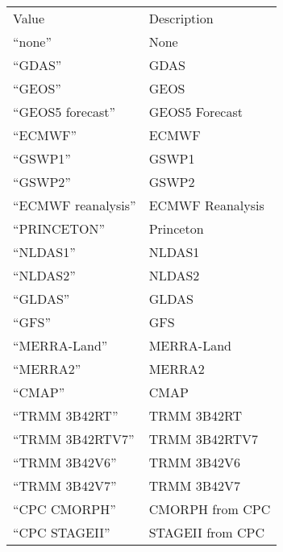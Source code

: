  \begin{tabular}{ll}
 Value                         & Description                        \\
 ``none''                      & None                               \\
 ``GDAS''                      & GDAS                               \\
 ``GEOS''                      & GEOS                               \\
 ``GEOS5 forecast''            & GEOS5 Forecast                     \\
 ``ECMWF''                     & ECMWF                              \\
 ``GSWP1''                     & GSWP1                              \\
 ``GSWP2''                     & GSWP2                              \\
 ``ECMWF reanalysis''          & ECMWF Reanalysis                   \\
 ``PRINCETON''                 & Princeton                          \\
 ``NLDAS1''                    & NLDAS1                             \\
 ``NLDAS2''                    & NLDAS2                             \\
 ``GLDAS''                     & GLDAS                              \\
 ``GFS''                       & GFS                                \\
 ``MERRA-Land''                & MERRA-Land                         \\
 ``MERRA2''                    & MERRA2                             \\
 ``CMAP''                      & CMAP                               \\
 ``TRMM 3B42RT''               & TRMM 3B42RT                        \\
 ``TRMM 3B42RTV7''             & TRMM 3B42RTV7                      \\
 ``TRMM 3B42V6''               & TRMM 3B42V6                        \\
 ``TRMM 3B42V7''               & TRMM 3B42V7                        \\
 ``CPC CMORPH''                & CMORPH from CPC                    \\
 ``CPC STAGEII''               & STAGEII from CPC                   \\

\end{tabular}
